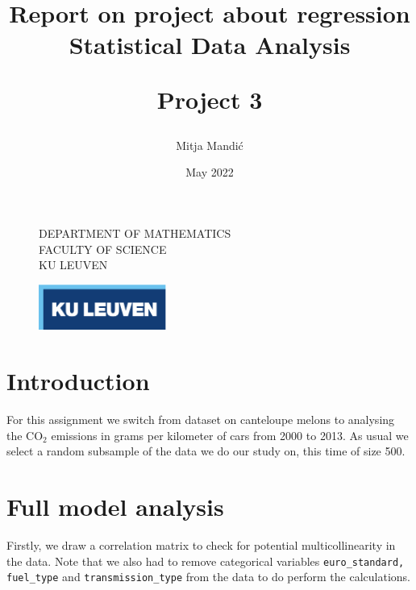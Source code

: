 \documentclass[12pt]{article}
\title{\vspace*{40.0mm}
  \bf Report on project about regression
         \vspace*{20.0mm} \\
  \Large\bf Statistical Data Analysis 
  
 
  
  Project 3 \vspace*{20.0mm}
  \vspace*{40.0mm}}
\author{Mitja Mandić}
\date{ May 2022}
\makeatletter
\def\cleardoublepage{\clearpage\if@twoside \ifodd\c@page\else%
\hbox{}%
\thispagestyle{empty}%
\clearpage%
\if@twocolumn\hbox{}\clearpage\fi\fi\fi}
\makeatother
\begin{document}
\begin{figure}
  \parbox[t]{125mm}{
    \vspace*{6mm}
    \scriptsize\sf           DEPARTMENT OF MATHEMATICS \\
    \scriptsize\sf           FACULTY OF SCIENCE\\
    \scriptsize\sf           KU LEUVEN}
  \parbox[t]{40mm}{
    \begin{flushright}
      \includegraphics[height=15mm]{../images/logo.eps.pdf}
    \end{flushright}}
\end{figure}

\maketitle
\thispagestyle{empty}
\raggedbottom

\cleardoublepage
{}
\setcounter{tocdepth}{2}
{}

\section{Introduction}
For this assignment we switch from dataset on canteloupe melons to analysing the $\text{CO}_{2}$ emissions in grams per kilometer
of cars from 2000 to 2013. As usual we select a random subsample of the data we do our study on, this time of size 500.

\section{Full model analysis}\label{fullModel}
Firstly, we draw a correlation matrix to check for potential multicollinearity in the data. Note that we also had to remove categorical
variables \texttt{euro\_standard, fuel\_type} and \texttt{transmission\_type} from the data to do perform the calculations.
\end{document}
